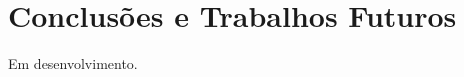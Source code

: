 \chapter{Conclusões e Trabalhos Futuros}\label{chap:conclusoes-e-trabalhos-futuros}

Em desenvolvimento.




